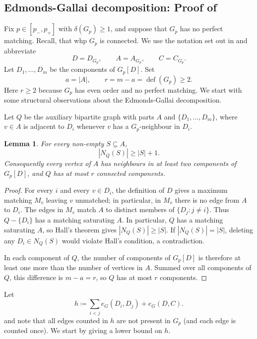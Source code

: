 \documentclass[notitlepage]{scrartcl}
\newtheorem{lemma}[thm]{Lemma}
\newcommand{\defi}{\operatorname{def}}
\begin{document}
\subsection{Edmonds-Gallai decomposition: Proof of }


Fix $p\in[p_-,p_+]$ with $\delta(G_p)\ge1$, and suppose that $G_p$ has no perfect matching. Recall, that whp $G_p$ is connected. %
We use the notation set out in  and abbreviate
\[
 D=D_{G_p},\qquad A=A_{G_p},\qquad C=C_{G_p}.
\]
Let $D_1,\ldots,D_m$ be the components of $G_p[D]$.
Set
\[
 a=|A|,\qquad r=m-a=\defi(G_p)\ge2.
\]
Here $r\ge2$ because $G_p$ has even order and no perfect matching.
We start with some structural observations about the Edmonds-Gallai decomposition.

Let $Q$ be the auxiliary bipartite graph with parts $A$ and $\{D_1,\ldots,D_m\}$, where $v\in A$ is adjacent to $D_i$ whenever $v$ has a $G_p$-neighbour in $D_i$.

\begin{lemma}\label{lem:strict-hall}
For every non-empty $S\subseteq A$,
\[
 |N_Q(S)|\ge|S|+1.
\]
Consequently every vertex of $A$ has neighbours in at least two components of $G_p[D]$, and $Q$ has at most $r$ connected components.
\end{lemma}

\begin{proof}
For every $i$ and every $v\in D_i$, the definition of $D$ gives a maximum matching $M_v$ leaving $v$ unmatched; in particular, in $M_v$ there is no edge from $A$ to $D_i$. 
The edges in $M_v$ match $A$ to distinct members of $\{D_j:j\ne i\}$.
Thus $Q-\{D_i\}$ has a matching saturating $A$.
In particular, $Q$ has a matching saturating $A$, so Hall's theorem gives $|N_Q(S)|\ge|S|$.
If $|N_Q(S)|=|S|$, deleting any $D_i\in N_Q(S)$ would violate Hall's condition, a contradiction.

In each component of $Q$, the number of components of $G_p[D]$ is therefore at least one more than the number of vertices in $A$.
Summed over all components of $Q$, this difference is $m-a=r$, so $Q$ has at most $r$ components.
\end{proof}

Let
\[
 h\coloneqq \sum_{i<j}e_G(D_i,D_j)+e_G(D,C).
\]
and note that all edges counted in $h$ are not present in $G_p$ (and each edge is counted once).
We start by giving a lower bound on $h$.
\end{document}

